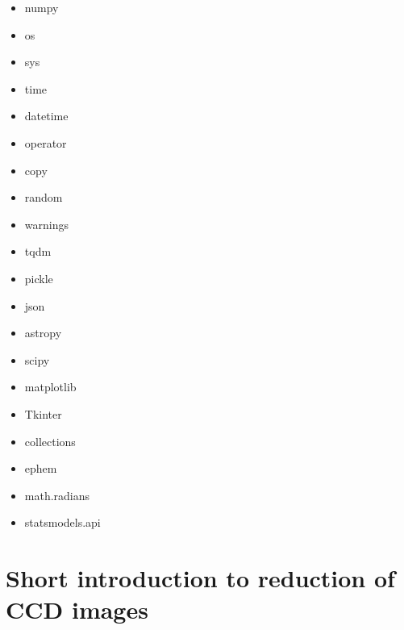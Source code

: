 \documentclass[10pt,a4paper]{article}
\begin{document}
\begin{itemize}\setlength\itemsep{0em}
\item numpy
\item os
\item sys
\item time
\item datetime
\item operator
\item copy
\item random
\item warnings
\item tqdm
\item pickle
\item json
\item astropy
\item scipy
\item matplotlib
\item Tkinter
\item collections
\item ephem
\item math.radians
\item statsmodels.api
\end{itemize}



\newpage
\appendix
\section{Short introduction to reduction of CCD images}
\end{document}
